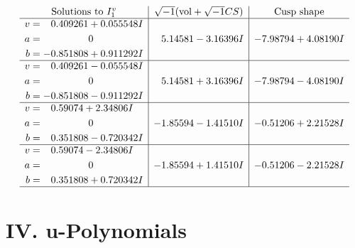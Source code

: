 \documentclass[1p]{elsarticle_modified}
\theoremstyle{definition}
\newcommand{\I}{\sqrt{-1}}
\begin{document}
$$\begin{array}{c|c|c}  
\text{Solutions to }I^v_{1}& \I (\text{vol} + \sqrt{-1}CS) & \text{Cusp shape}\\
 \hline 
\begin{aligned}
v &= \phantom{-}0.409261 + 0.055548 I \\
a &= \phantom{-0.000000 } 0 \\
b &= -0.851808 + 0.911292 I\end{aligned}
 & \phantom{-}5.14581 - 3.16396 I & -7.98794 + 4.08190 I \\ \hline\begin{aligned}
v &= \phantom{-}0.409261 - 0.055548 I \\
a &= \phantom{-0.000000 } 0 \\
b &= -0.851808 - 0.911292 I\end{aligned}
 & \phantom{-}5.14581 + 3.16396 I & -7.98794 - 4.08190 I \\ \hline\begin{aligned}
v &= \phantom{-}0.59074 + 2.34806 I \\
a &= \phantom{-0.000000 } 0 \\
b &= \phantom{-}0.351808 - 0.720342 I\end{aligned}
 & -1.85594 - 1.41510 I & -0.51206 + 2.21528 I \\ \hline\begin{aligned}
v &= \phantom{-}0.59074 - 2.34806 I \\
a &= \phantom{-0.000000 } 0 \\
b &= \phantom{-}0.351808 + 0.720342 I\end{aligned}
 & -1.85594 + 1.41510 I & -0.51206 - 2.21528 I\\
 \hline 
 \end{array}$$\newpage
\newpage\renewcommand{\arraystretch}{1}
\centering \section*{ IV. u-Polynomials}
\end{document}
